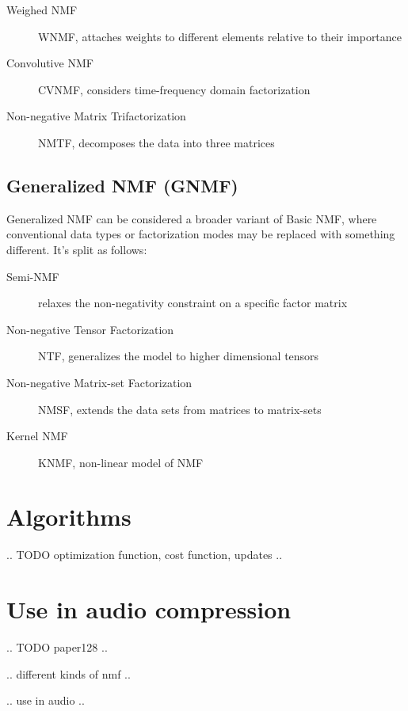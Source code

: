 \begin{description}
	\item[Weighed NMF] WNMF, attaches weights to different elements relative to their importance
	\item[Convolutive NMF] CVNMF, considers time-frequency domain factorization
	\item[Non-negative Matrix Trifactorization] NMTF, decomposes the data into three matrices
\end{description}

\subsection{Generalized NMF (GNMF)}
Generalized NMF can be considered a broader variant of Basic NMF, where conventional data types or factorization modes may be replaced with something different. It's split as follows:

\begin{description}
	\item[Semi-NMF] relaxes the non-negativity constraint on a specific factor matrix
	\item[Non-negative Tensor Factorization] NTF, generalizes the model to higher dimensional tensors
	\item[Non-negative Matrix-set Factorization] NMSF, extends the data sets from matrices to matrix-sets
	\item[Kernel NMF] KNMF, non-linear model of NMF
\end{description}

\section{Algorithms}
.. TODO optimization function, cost function, updates ..

\section{Use in audio compression}
.. TODO paper128 ..

.. different kinds of nmf ..

.. use in audio ..
